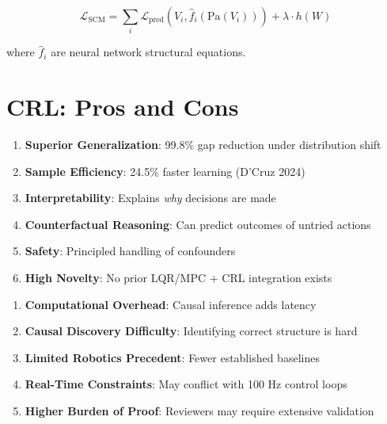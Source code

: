 \documentclass[11pt,a4paper]{article}
\begin{document}
\begin{equation}
  \mathcal{L}_{\text{SCM}} = \sum_i \mathcal{L}_{\text{pred}}(V_i, \hat{f}_i(\text{Pa}(V_i))) + \lambda \cdot h(W)
\end{equation}

where $\hat{f}_i$ are neural network structural equations.

\section{CRL: Pros and Cons}

\begin{crlbox}[Advantages]
\begin{enumerate}
  \item \textbf{Superior Generalization}: 99.8\% gap reduction under distribution shift
  \item \textbf{Sample Efficiency}: 24.5\% faster learning (D'Cruz 2024)
  \item \textbf{Interpretability}: Explains \textit{why} decisions are made
  \item \textbf{Counterfactual Reasoning}: Can predict outcomes of untried actions
  \item \textbf{Safety}: Principled handling of confounders
  \item \textbf{High Novelty}: No prior LQR/MPC + CRL integration exists
\end{enumerate}
\end{crlbox}

\begin{warningbox}[Challenges]
\begin{enumerate}
  \item \textbf{Computational Overhead}: Causal inference adds latency
  \item \textbf{Causal Discovery Difficulty}: Identifying correct structure is hard
  \item \textbf{Limited Robotics Precedent}: Fewer established baselines
  \item \textbf{Real-Time Constraints}: May conflict with 100 Hz control loops
  \item \textbf{Higher Burden of Proof}: Reviewers may require extensive validation
\end{enumerate}
\end{warningbox}

\newpage
\end{document}

